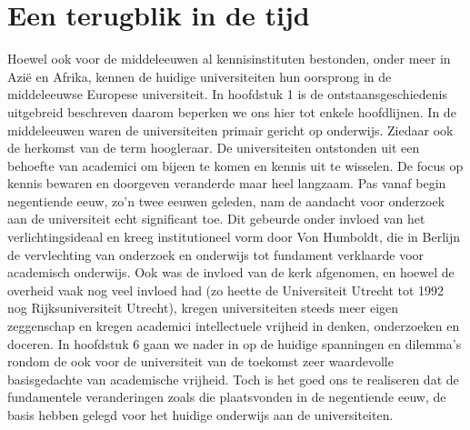 \documentclass{jote-book}
\begin{document}
	\section{Een terugblik in de tijd}



	Hoewel ook voor de middeleeuwen al kennisinstituten bestonden, onder meer in Azië en Afrika, kennen de huidige universiteiten hun oorsprong in de middeleeuwse Europese universiteit. In hoofdstuk 1 is de ontstaansgeschiedenis uitgebreid beschreven daarom beperken we ons hier tot enkele hoofdlijnen. In de middeleeuwen waren de universiteiten primair gericht op onderwijs. Ziedaar ook de herkomst van de term hoogleraar. De universiteiten ontstonden uit een behoefte van academici om bijeen te komen en kennis uit te wisselen. De focus op kennis bewaren en doorgeven veranderde maar heel langzaam. Pas vanaf begin negentiende eeuw, zo'n twee eeuwen geleden, nam de aandacht voor onderzoek aan de universiteit echt significant toe. Dit gebeurde onder invloed van het verlichtingsideaal en kreeg institutioneel vorm door Von Humboldt, die in Berlijn de vervlechting van onderzoek en onderwijs tot fundament verklaarde voor academisch onderwijs. Ook was de invloed van de kerk afgenomen, en hoewel de overheid vaak nog veel invloed had (zo heette de Universiteit Utrecht tot 1992 nog Rijksuniversiteit Utrecht), kregen universiteiten steeds meer eigen zeggenschap en kregen academici intellectuele vrijheid in denken, onderzoeken en doceren. In hoofdstuk 6 gaan we nader in op de huidige spanningen en dilemma's rondom de ook voor de universiteit van de toekomst zeer waardevolle basisgedachte van academische vrijheid. Toch is het goed ons te realiseren dat de fundamentele veranderingen zoals die plaatsvonden in de negentiende eeuw, de basis hebben gelegd voor het huidige onderwijs aan de universiteiten.
\end{document}
